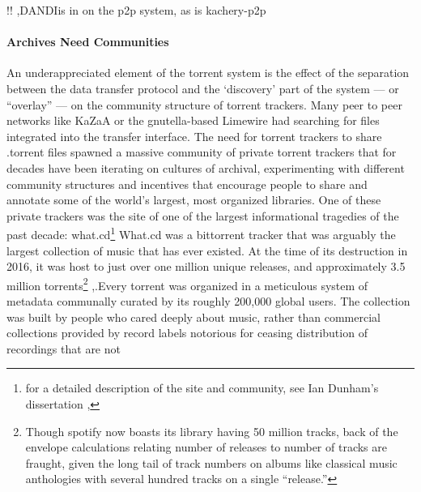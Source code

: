 \documentclass{article}
\begin{document}
!! \cite{langilleBioTorrentsFileSharing2010},DANDIis in on the
p2p system, as is kachery-p2p

\hypertarget{archives-need-communities}{%
\paragraph{Archives Need Communities}\label{archives-need-communities}}

An underappreciated element of the torrent system is the effect of the
separation between the data transfer protocol and the `discovery' part
of the system --- or ``overlay'' --- on the community structure of
torrent trackers. Many peer to peer networks like KaZaA or the
gnutella-based Limewire had searching for files integrated into the
transfer interface. The need for torrent trackers to share .torrent
files spawned a massive community of private torrent trackers that for
decades have been iterating on cultures of archival, experimenting with
different community structures and incentives that encourage people to
share and annotate some of the world's largest, most organized
libraries. One of these private trackers was the site of one of the
largest informational tragedies of the past decade: what.cd\footnote{for
  a detailed description of the site and community, see Ian Dunham's
  dissertation \cite{dunhamWhatCDLegacy2018},}
What.cd was a bittorrent tracker that was arguably the largest
collection of music that has ever existed. At the time of its
destruction in 2016, it was host to just over one million unique
releases, and approximately 3.5 million torrents\footnote{Though spotify
  now boasts its library having 50 million tracks, back of the envelope
  calculations relating number of releases to number of tracks are
  fraught, given the long tail of track numbers on albums like classical
  music anthologies with several hundred tracks on a single ``release.''}
\cite{dunhamWhatCDLegacy2018},.Every torrent was organized in a
meticulous system of metadata communally curated by its roughly 200,000
global users. The collection was built by people who cared deeply about
music, rather than commercial collections provided by record labels
notorious for ceasing distribution of recordings that are not
\end{document}
